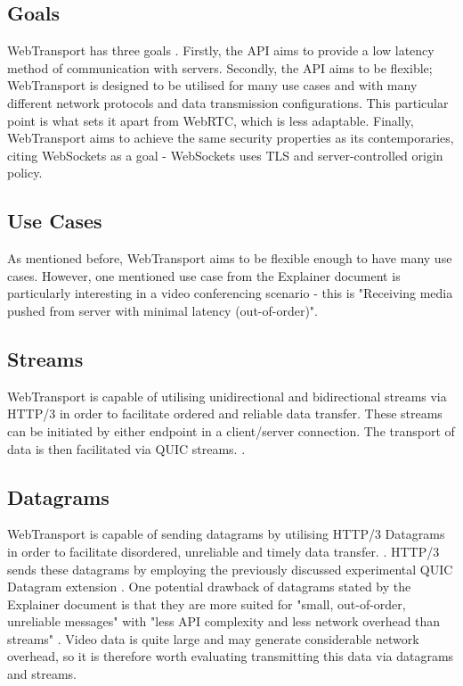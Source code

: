 \subsection{Goals}

WebTransport has three goals \cite{wtexplainer}. Firstly, the API aims to provide a low latency method of communication with servers. Secondly, the API aims to be flexible; WebTransport is designed to be utilised for many use cases and with many different network protocols and data transmission configurations. This particular point is what sets it apart from WebRTC, which is less adaptable. Finally, WebTransport aims to achieve the same security properties as its contemporaries, citing WebSockets as a goal - WebSockets uses TLS and server-controlled origin policy. 

\subsection{Use Cases}

As mentioned before, WebTransport aims to be flexible enough to have many use cases. However, one mentioned use case from the Explainer document \cite{wtexplainer} is particularly interesting in a video conferencing scenario - this is "Receiving media pushed from server with minimal latency (out-of-order)". 

\subsection{Streams}
WebTransport is capable of utilising unidirectional and bidirectional streams via HTTP/3 in order to facilitate ordered and reliable data transfer. These streams can be initiated by either endpoint in a client/server connection. The transport of data is then facilitated via QUIC streams. \cite{vvv-webtransport-http3-03}.

\subsection{Datagrams}
WebTransport is capable of sending datagrams by utilising HTTP/3 Datagrams in order to facilitate disordered, unreliable and timely data transfer. \cite{vvv-webtransport-http3-03}. HTTP/3 sends these datagrams by employing the previously discussed experimental QUIC Datagram extension \cite{quic-datagrams-draft}. 
One potential drawback of datagrams stated by the Explainer document is that they are more suited for "small, out-of-order, unreliable messages" with "less API complexity and less network overhead than streams" \cite{wtexplainer}. Video data is quite large and may generate considerable network overhead, so it is therefore worth evaluating transmitting this data via datagrams and streams.



